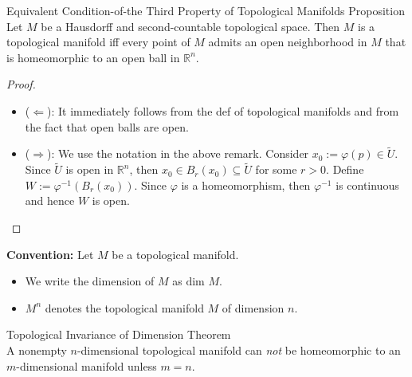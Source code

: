 \begin{proposition}{Equivalent Condition-of-the Third Property of Topological Manifolds Proposition}\\
Let $M$ be a Hausdorff and second-countable topological space. Then $M$ is a topological manifold iff every point of $M$ admits an open neighborhood in $M$ that is homeomorphic to an open ball in $\mathbb{R}^n$.
\end{proposition}

\begin{proof}
    \begin{itemize}
        \item ($\Leftarrow$): It immediately follows from the def of topological manifolds and from the fact that open balls are open.

        \item ($\Rightarrow$): We use the notation in the above remark. Consider $x_0:= \varphi(p) \in \tilde{U}$. Since $\tilde{U}$ is open in $\mathbb{R}^n$, then $x_0 \in B_r(x_0) \subseteq \tilde{U}$ for some $r>0$. Define $W:= \varphi^{-1} (B_r(x_0))$. Since $\varphi$ is a homeomorphism, then $\varphi^{-1}$ is continuous and hence $W$ is open.
    \end{itemize}
\end{proof}

\noindent\textbf{Convention:} Let $M$ be a topological manifold.
\begin{itemize}
    \item We write the dimension of $M$ as $\text{dim }M$.
    \item $M^n$ denotes the topological manifold $M$ of dimension $n$.
\end{itemize}

\begin{theorem}{Topological Invariance of Dimension Theorem}\\
A nonempty $n$-dimensional topological manifold can \textit{not} be homeomorphic to an $m$-dimensional manifold unless $m=n$.
\end{theorem}

